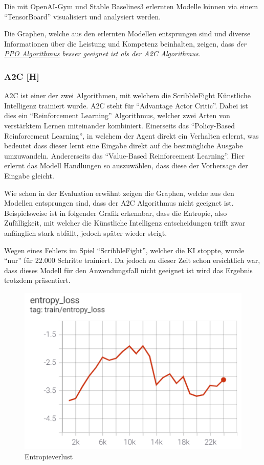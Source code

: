 Die mit OpenAI-Gym und Stable Baselines3 erlernten Modelle können via einem ``TensorBoard'' visualisiert und analysiert werden.

Die Graphen, welche aus den erlernten Modellen entsprungen sind und diverse Informationen über die Leistung und Kompetenz beinhalten,
zeigen, dass \textit{der \underline{PPO Algorithmus} besser geeignet ist als der A2C Algorithmus.}

\subsubsection{A2C [H]}
A2C ist einer der zwei Algorithmen, mit welchem die ScribbleFight Künstliche Intelligenz trainiert wurde.
A2C steht für ``Advantage Actor Critic''. Dabei ist dies ein ``Reinforcement Learning'' Algorithmus, welcher
zwei Arten von verstärktem Lernen miteinander kombiniert. Einerseits das ``Policy-Based Reinforcement Learning'', in welchem
der Agent direkt ein Verhalten erlernt, was bedeutet dass dieser lernt eine Eingabe direkt auf die bestmögliche Ausgabe umzuwandeln.
Andererseits das ``Value-Based Reinforcement Learning''. Hier erlernt das Modell Handlungen so auszuwählen, dass
diese der Vorhersage der Eingabe gleicht. \cite{atwoc}

Wie schon in der Evaluation erwähnt zeigen die Graphen, welche aus den Modellen entsprungen sind, dass der A2C Algorithmus nicht geeignet ist. Beispielsweise ist in folgender Grafik erkennbar, dass die Entropie, also Zufälligkeit, mit welcher die Künstliche Intelligenz
entscheidungen trifft zwar anfänglich stark abfällt, jedoch später wieder steigt.

Wegen eines Fehlers im Spiel ``ScribbleFight'', welcher die KI stoppte, wurde ``nur'' für 22.000 Schritte trainiert.
Da jedoch zu dieser Zeit schon ersichtlich war, dass dieses Modell für den Anwendungsfall nicht geeignet ist wird das Ergebnis trotzdem präsentiert.

\begin{figure}[H]
  \centering
  \includegraphics[scale=0.7]{pics/Tensorboard/A2C/entropy_loss.png}
  \caption{Entropieverlust}
  \label{fig:a2c:entropyloss}
\end{figure}


